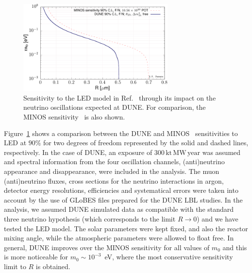 \begin{figure}[ht]
\centerline{
\includegraphics[width=0.7\textwidth]{graphics/LED_sensitivity.pdf}
}
\caption[DUNE sensitivity to the LED model]{Sensitivity to the LED model in Ref.~\cite{Dienes:1998sb,ArkaniHamed:1998vp,Davoudiasl:2002fq} through its impact on the neutrino oscillations expected at 
DUNE. For comparison, the MINOS sensitivity~\cite{Adamson:2016yvy} is also shown.}
\label{fig:ledsensitivity}
\end{figure}

Figure~\ref{fig:ledsensitivity} shows a comparison between the DUNE and MINOS~\cite{Adamson:2016yvy} 
sensitivities to LED at $90\%$  for two degrees of freedom represented by the solid and dashed lines, respectively. 
In the case of DUNE, an exposure of $300\,\text{kt}\,\text{MW}\,\text{year}$ 
was assumed and spectral information from the four oscillation channels, (anti)neutrino 
appearance and disappearance, were included in the analysis. The muon (anti)neutrino 
fluxes, cross sections for the neutrino interactions in argon, detector energy 
resolutions, efficiencies and systematical errors were taken into account by the use of 
GLoBES files prepared for the DUNE LBL studies. In the analysis, we assumed DUNE 
simulated data as compatible with the standard three neutrino hypothesis (which corresponds to the limit $R\to 0$) and we have 
tested the LED model. The solar parameters were kept fixed, and also the reactor mixing 
angle, while the atmospheric parameters were allowed to float free. In general, DUNE 
improves over the MINOS sensitivity for all values of $m_0$ and this is more noticeable 
for $m_0\sim 10^{-3}$~eV, where the most conservative sensitivity limit to $R$ is 
obtained. 

